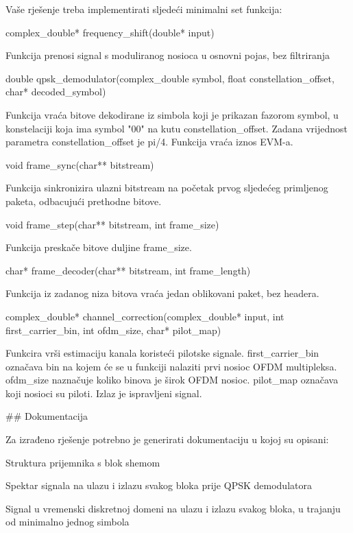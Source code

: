 Vaše rješenje treba implementirati sljedeći minimalni set funkcija:
\item complex_double* frequency_shift(double* input)
\item[] Funkcija prenosi signal s moduliranog nosioca u osnovni pojas, bez filtriranja
\item double qpsk_demodulator(complex_double symbol, float constellation_offset, char* decoded_symbol)
\item[] Funkcija vraća bitove dekodirane iz simbola koji je prikazan fazorom symbol, u konstelaciji koja ima symbol "00" na kutu constellation_offset. Zadana vrijednost parametra constellation_offset je pi/4. Funkcija vraća iznos EVM-a.
\item void frame_sync(char** bitstream)
\item[] Funkcija sinkronizira ulazni bitstream na početak prvog sljedećeg primljenog paketa, odbacujući prethodne bitove.
\item void frame_step(char** bitstream, int frame_size)
\item[] Funkcija preskače bitove duljine frame_size.
\item char* frame_decoder(char** bitstream, int frame_length)
\item[] Funkcija iz zadanog niza bitova vraća jedan oblikovani paket, bez headera.
\item complex_double* channel_correction(complex_double* input, int first_carrier_bin, int ofdm_size, char* pilot_map)
\item[] Funkcira vrši estimaciju kanala koristeći pilotske signale. first_carrier_bin označava bin na kojem će se u funkciji nalaziti prvi nosioc OFDM multipleksa. ofdm_size naznačuje koliko binova je širok OFDM nosioc. pilot_map označava koji nosioci su piloti. Izlaz je ispravljeni signal.

## Dokumentacija

Za izrađeno rješenje potrebno je generirati dokumentaciju u kojoj su opisani:
\item Struktura prijemnika s blok shemom
\item Spektar signala na ulazu i izlazu svakog bloka prije QPSK demodulatora
\item Signal u vremenski diskretnoj domeni na ulazu i izlazu svakog bloka, u trajanju od minimalno jednog simbola
